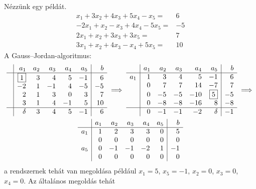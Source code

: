 \documentclass[9pt, a4paper, showtrims]{memoir}
\theoremstyle{plain}
\theoremstyle{remark}
\theoremstyle{definition}
\begin{document}
Nézzünk egy példát.
\[
    \begin{array}{rl}
        x_1+3x_2+4x_3+5x_4-x_5=&6  \\
        -2x_1+x_2-x_3+4x_4-5x_5=&-5  \\
        2x_1+x_2+3x_3+3x_5=&7  \\
        3x_1+x_2+4x_3-x_4+5x_5=&10 
    \end{array}
\]
A Gauss--Jordan-algoritmus: 
\begin{multline*}
    \begin{array}{c|rrrrr|r}
        &a_1&a_2&a_3&a_4&a_5&b\\
        \hline
        &\boxed{1}&3&4&5&-1&6\\
        &-2&1&-1&4&-5&-5\\
        &2&1&3&0&3&7\\
        &3&1&4&-1&5&10\\
        \hline
        &\delta&3&4&5&-1&6
    \end{array}
    \implies
    \begin{array}{c|rrrrr|r}
        &a_1&a_2&a_3&a_4&a_5&b\\
        \hline
        a_1&1&3&4&5&-1&6\\
        &0&7&7&14&-7&7\\
        &0&-5&-5&-10&\boxed{5}&-5\\
        &0&-8&-8&-16&8&-8\\
        \hline
        &0&-1&-1&-2&\delta&-1
    \end{array}
    \implies
    \\
    \begin{array}{c|rrrrr|r}
        &a_1&a_2&a_3&a_4&a_5&b\\
        \hline
        a_1&1&2&3&3&0&5\\
        &0&0&0&0&0&0\\
        a_5&0&-1&-1&-2&1&-1\\
        &0&0&0&0&0&0\\
    \end{array}
\end{multline*}
a rendszernek tehát van megoldása például $x_1=5$, $x_5=-1$, $x_2=0$, $x_3=0$, $x_4=0$.
Az általános megoldás tehát
\end{document}
